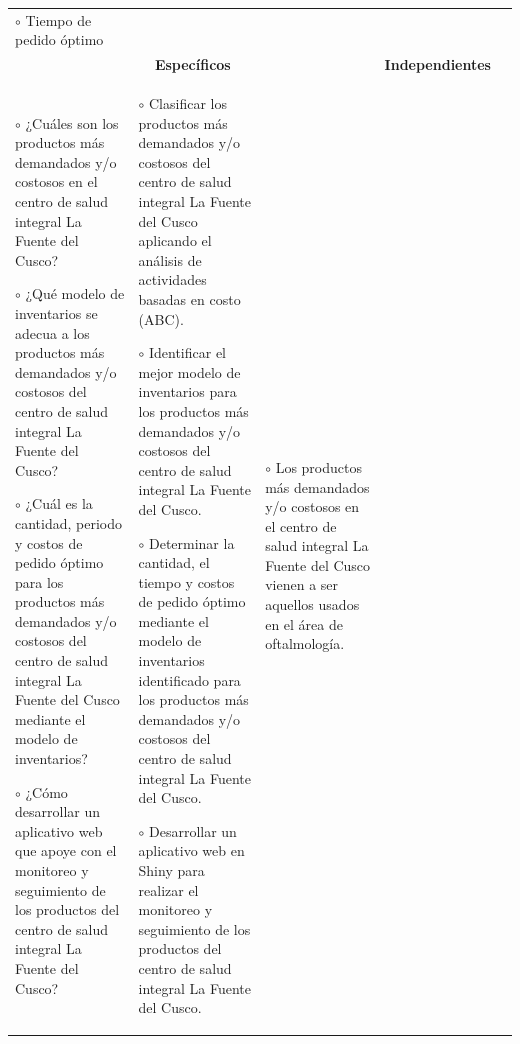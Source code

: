 \begin{landscape}
\begin{table}[h!]
\begin{tabular}{|p{4.5cm}|p{4.5cm}|p{4.5cm}|p{3cm}|p{4.2cm}|}
    $\circ$ Tiempo de pedido óptimo\vspace{0.2cm}
  &                       \\ \cline{1-4}
\multicolumn{3}{|c|}{\textbf{Específicos}}                               & \textbf{Independientes} &  \\ \cline{1-4}
\multicolumn{1}{|p{4.5cm}|}{
    $\circ$ ¿Cuáles son los productos más demandados y/o costosos en el centro de salud integral La Fuente del Cusco?\vspace{0.2cm}

    $\circ$ ¿Qué modelo de inventarios se adecua a los productos más demandados y/o costosos del centro de salud integral La Fuente del Cusco?\vspace{0.2cm}

    $\circ$ ¿Cuál es la cantidad, periodo y costos de pedido óptimo para los productos más demandados y/o costosos del centro de salud integral La Fuente del Cusco mediante el modelo de inventarios?\vspace{0.2cm}

    $\circ$ ¿Cómo desarrollar un aplicativo web que apoye con el monitoreo y seguimiento de los productos del centro de salud integral La Fuente del Cusco?} & \multicolumn{1}{p{4.5cm}|}{
    $\circ$ Clasificar los productos más demandados y/o costosos del centro de salud integral La Fuente del Cusco aplicando el análisis de actividades basadas en costo (ABC).\vspace{0.2cm}

    $\circ$ Identificar el mejor modelo de inventarios para los productos más demandados y/o costosos del centro de salud integral La Fuente del Cusco.\vspace{0.2cm}

    $\circ$ Determinar la cantidad, el tiempo y costos de pedido óptimo mediante el modelo de inventarios identificado para los productos más demandados y/o costosos del centro de salud integral La Fuente del Cusco.\vspace{0.2cm}

    $\circ$ Desarrollar un aplicativo web en Shiny para realizar el monitoreo y seguimiento de los productos del centro de salud integral La Fuente del Cusco.

    } & \multicolumn{1}{p{4.5cm}|}{
    $\circ$ Los productos más demandados y/o costosos en el centro de salud integral La Fuente del Cusco vienen a ser aquellos usados en el área de oftalmología.\vspace{0.2cm}

}
\end{tabular}
\end{table}
\end{landscape}
